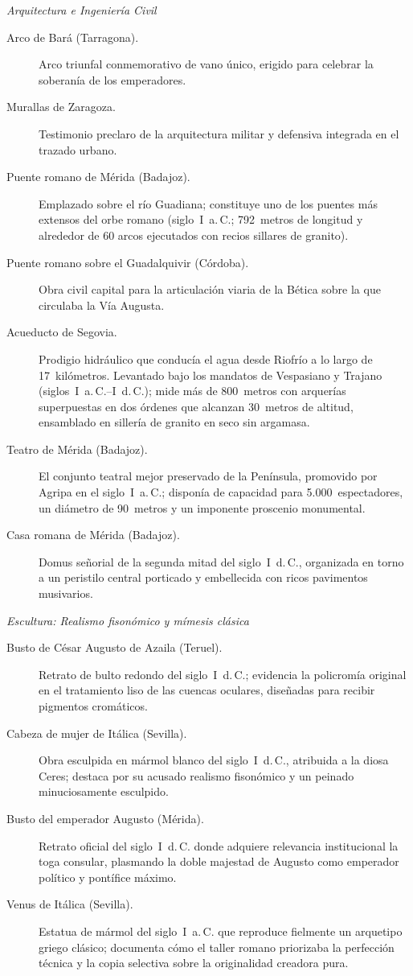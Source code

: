 \documentclass[11pt,letterpaper]{article}
\begin{document}
\begin{enumerate}[resume]
  \textit{Arquitectura e Ingeniería Civil}
  \begin{description}
    \item[Arco de Bará (Tarragona).] Arco triunfal conmemorativo de vano único, erigido para celebrar la soberanía de los emperadores.
    \item[Murallas de Zaragoza.] Testimonio preclaro de la arquitectura militar y defensiva integrada en el trazado urbano.
    \item[Puente romano de Mérida (Badajoz).] Emplazado sobre el río Guadiana; constituye uno de los puentes más extensos del orbe romano (siglo~I~a.\,C.; 792~metros de longitud y alrededor de 60 arcos ejecutados con recios sillares de granito).
    \item[Puente romano sobre el Guadalquivir (Córdoba).] Obra civil capital para la articulación viaria de la Bética sobre la que circulaba la Vía Augusta.
    \item[Acueducto de Segovia.] Prodigio hidráulico que conducía el agua desde Riofrío a lo largo de 17~kilómetros. Levantado bajo los mandatos de Vespasiano y Trajano (siglos~I~a.\,C.--I~d.\,C.); mide más de 800~metros con arquerías superpuestas en dos órdenes que alcanzan 30~metros de altitud, ensamblado en sillería de granito en seco sin argamasa.
    \item[Teatro de Mérida (Badajoz).] El conjunto teatral mejor preservado de la Península, promovido por Agripa en el siglo~I~a.\,C.; disponía de capacidad para 5.000~espectadores, un diámetro de 90~metros y un imponente proscenio monumental.
    \item[Casa romana de Mérida (Badajoz).] Domus señorial de la segunda mitad del siglo~I~d.\,C., organizada en torno a un peristilo central porticado y embellecida con ricos pavimentos musivarios.
  \end{description}

  \textit{Escultura: Realismo fisonómico y mímesis clásica}
  \begin{description}
    \item[Busto de César Augusto de Azaila (Teruel).] Retrato de bulto redondo del siglo~I~d.\,C.; evidencia la policromía original en el tratamiento liso de las cuencas oculares, diseñadas para recibir pigmentos cromáticos.
    \item[Cabeza de mujer de Itálica (Sevilla).] Obra esculpida en mármol blanco del siglo~I~d.\,C., atribuida a la diosa Ceres; destaca por su acusado realismo fisonómico y un peinado minuciosamente esculpido.
    \item[Busto del emperador Augusto (Mérida).] Retrato oficial del siglo~I~d.\,C. donde adquiere relevancia institucional la toga consular, plasmando la doble majestad de Augusto como emperador político y pontífice máximo.
    \item[Venus de Itálica (Sevilla).] Estatua de mármol del siglo~I~a.\,C. que reproduce fielmente un arquetipo griego clásico; documenta cómo el taller romano priorizaba la perfección técnica y la copia selectiva sobre la originalidad creadora pura.
  \end{description}


\end{enumerate}
\end{document}
